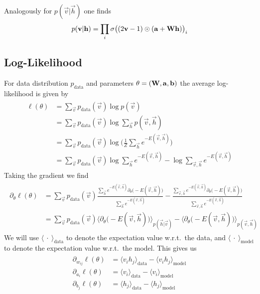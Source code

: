 Analogously for \( p(\vec{v} | \vec{h}) \) one finds
\begin{align}
    p(\mathbf{v} | \mathbf{h}) = \prod_i \sigma\big( (2\mathbf{v} - 1) \odot (\mathbf{a} + \mathbf{W}\mathbf{h}) \big)_i
\end{align}

\subsection{Log-Likelihood}\label{app:rbm_log_likelihood_derivation}
For data distribution \( p_\text{data} \) and parameters \( \theta = (\mathbf{W}, \mathbf{a}, \mathbf{b}) \) the average log-likelihood is given by
\begin{align}
\begin{split}
    \ell(\theta)
        &= \sum_{\vec{v}} p_{\text{data}}(\vec{v}) \log p(\vec{v}) \\
        &= \sum_{\vec{v}} p_{\text{data}}(\vec{v}) \log \sum_\vec{h} p(\vec{v},\vec{h}) \\
        &= \sum_{\vec{v}} p_{\text{data}}(\vec{v}) \log \bigg(\frac{1}{Z} \sum_\vec{h} e^{-E(\vec{v},\vec{h})}\bigg) \\
        &= \sum_{\vec{v}} p_{\text{data}}(\vec{v}) \log \sum_\vec{h} e^{-E(\vec{v},\vec{h})} - \log \sum_{\vec{v},\vec{h}} e^{-E(\vec{v},\vec{h})}
\end{split}
\end{align}
Taking the gradient we find
\begin{align}
\begin{split}
    \partial_{\theta} \ell(\theta)
        &= \sum_{\vec{v}} p_{\text{data}}(\vec{v}) \frac{\sum_\vec{h} e^{-E(\vec{v},\vec{h})} \partial_{\theta}\big( -E(\vec{v},\vec{h}) \big) }{\sum_\vec{h} e^{-E(\vec{v},\vec{h})}}
            - \frac{\sum_{\vec{v},\vec{h}} e^{-E(\vec{v},\vec{h})} \partial_{\theta}\big( -E(\vec{v},\vec{h}) \big) }{\sum_{\vec{v},\vec{h}} e^{-E(\vec{v},\vec{h})}} \\
        &= \sum_{\vec{v}} p_{\text{data}}(\vec{v}) \Big\langle \partial_{\theta}\big( -E(\vec{v},\vec{h}) \big) \Big\rangle_{p(\vec{h}|\vec{v})}
        - \Big\langle \partial_{\theta}\big( -E(\vec{v},\vec{h}) \big) \Big\rangle_{p(\vec{v},\vec{h})}
\end{split}
\end{align}
We will use \( \langle \ \cdot \ \rangle_{\text{data}} \) to denote the expectation value w.r.t.\ the data, and \( \langle \ \cdot \ \rangle_{\text{model}} \) to denote the expectation value w.r.t.\ the model.
This gives us
\begin{align}
\begin{split}
    \partial_{w_{ij}} \ell(\theta)
        &= \langle v_i h_j \rangle_{\text{data}} - \langle v_i h_j \rangle_{\text{model}} \\
    \partial_{a_i} \ell(\theta)
        &= \langle v_i \rangle_{\text{data}} - \langle v_i \rangle_{\text{model}} \\
    \partial_{b_j} \ell(\theta)
        &= \langle h_j \rangle_{\text{data}} - \langle h_j \rangle_{\text{model}}
\end{split}
\end{align}

